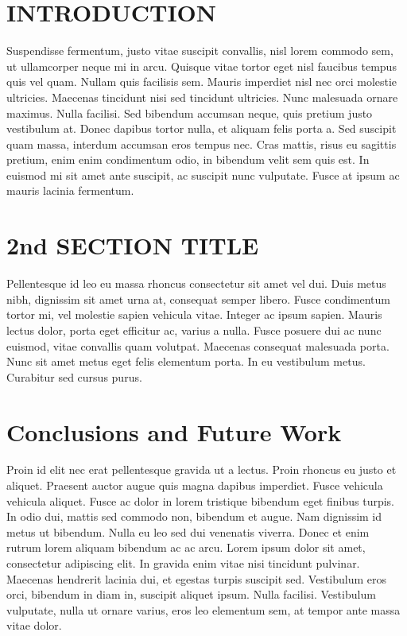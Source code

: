 \documentclass{article}
\begin{document}
	\begin{multicols}{2}
	\section{INTRODUCTION}
	Suspendisse fermentum, justo vitae suscipit convallis, nisl lorem commodo sem, ut ullamcorper neque mi in arcu. Quisque vitae tortor eget nisl faucibus tempus quis vel quam. Nullam quis facilisis sem. Mauris imperdiet nisl nec orci molestie ultricies. Maecenas tincidunt nisi sed tincidunt ultricies. Nunc malesuada ornare maximus. Nulla facilisi. Sed bibendum accumsan neque, quis pretium justo vestibulum at. Donec dapibus tortor nulla, et aliquam felis porta a. Sed suscipit quam massa, interdum accumsan eros tempus nec. Cras mattis, risus eu sagittis pretium, enim enim condimentum odio, in bibendum velit sem quis est. In euismod mi sit amet ante suscipit, ac suscipit nunc vulputate. Fusce at ipsum ac mauris lacinia fermentum.
		
	\section{2nd SECTION TITLE}
Pellentesque id leo eu massa rhoncus consectetur sit amet vel dui. Duis metus nibh, dignissim sit amet urna at, consequat semper libero. Fusce condimentum tortor mi, vel molestie sapien vehicula vitae. Integer ac ipsum sapien. Mauris lectus dolor, porta eget efficitur ac, varius a nulla. Fusce posuere dui ac nunc euismod, vitae convallis quam volutpat. Maecenas consequat malesuada porta. Nunc sit amet metus eget felis elementum porta. In eu vestibulum metus. Curabitur sed cursus purus.


	\section{Conclusions and Future Work}
	Proin id elit nec erat pellentesque gravida ut a lectus. Proin rhoncus eu justo et aliquet. Praesent auctor augue quis magna dapibus imperdiet. Fusce vehicula vehicula aliquet. Fusce ac dolor in lorem tristique bibendum eget finibus turpis. In odio dui, mattis sed commodo non, bibendum et augue. Nam dignissim id metus ut bibendum. Nulla eu leo sed dui venenatis viverra. Donec et enim rutrum lorem aliquam bibendum ac ac arcu. Lorem ipsum dolor sit amet, consectetur adipiscing elit. In gravida enim vitae nisi tincidunt pulvinar. Maecenas hendrerit lacinia dui, et egestas turpis suscipit sed. Vestibulum eros orci, bibendum in diam in, suscipit aliquet ipsum. Nulla facilisi. Vestibulum vulputate, nulla ut ornare varius, eros leo elementum sem, at tempor ante massa vitae dolor.	
	
    
    
	
	\end{multicols}
\end{document}
